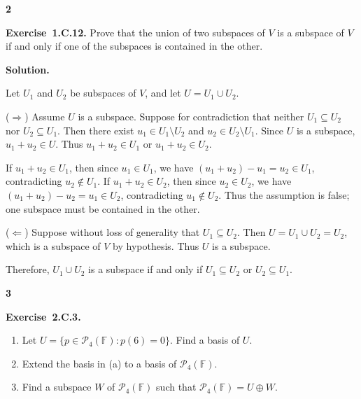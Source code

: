 \documentclass[11pt]{article}
\newcommand{\ProblemDivider}[1]{%
  \vspace{1.0em}
  \noindent\textbf{#1}\par
  \vspace{0.35em}
}
\newcommand{\ProblemAnnounce}{\noindent}
\newcommand{\SolutionAnnounce}{\noindent\textbf{Solution.}\par\medskip}
\newcommand{\Exercise}[1]{\textbf{Exercise~#1.}\;}
\newcommand{\F}{\mathbb{F}}
\newcommand{\Pcal}{\mathcal{P}}
\begin{document}
\ProblemDivider{2}

\begin{problemBox}
\ProblemAnnounce
\Exercise{1.C.12}
Prove that the union of two subspaces of $V$ is a subspace of $V$ if and only if one of the subspaces is contained in the other.
\end{problemBox}

\begin{solutionBox}
\SolutionAnnounce
\doublespacing

Let $U_1$ and $U_2$ be subspaces of $V$, and let $U = U_1 \cup U_2$.

($\Rightarrow$) Assume $U$ is a subspace. Suppose for contradiction that neither $U_1 \subseteq U_2$ nor $U_2 \subseteq U_1$. Then there exist $u_1 \in U_1 \setminus U_2$ and $u_2 \in U_2 \setminus U_1$. Since $U$ is a subspace, $u_1 + u_2 \in U$. Thus $u_1 + u_2 \in U_1$ or $u_1 + u_2 \in U_2$.

If $u_1 + u_2 \in U_1$, then since $u_1 \in U_1$, we have $(u_1 + u_2) - u_1 = u_2 \in U_1$, contradicting $u_2 \notin U_1$. If $u_1 + u_2 \in U_2$, then since $u_2 \in U_2$, we have $(u_1 + u_2) - u_2 = u_1 \in U_2$, contradicting $u_1 \notin U_2$. Thus the assumption is false; one subspace must be contained in the other.

($\Leftarrow$) Suppose without loss of generality that $U_1 \subseteq U_2$. Then $U = U_1 \cup U_2 = U_2$, which is a subspace of $V$ by hypothesis. Thus $U$ is a subspace.

Therefore, $U_1 \cup U_2$ is a subspace if and only if $U_1 \subseteq U_2$ or $U_2 \subseteq U_1$.
\end{solutionBox}

\ProblemDivider{3}

\begin{problemBox}
\ProblemAnnounce
\Exercise{2.C.3}
\begin{enumerate}
  \item[(a)] Let $U = \{p \in \Pcal_4(\F) : p(6) = 0\}$. Find a basis of $U$.
  \item[(b)] Extend the basis in (a) to a basis of $\Pcal_4(\F)$.
  \item[(c)] Find a subspace $W$ of $\Pcal_4(\F)$ such that $\Pcal_4(\F) = U \oplus W$.
\end{enumerate}
\end{problemBox}
\end{document}
